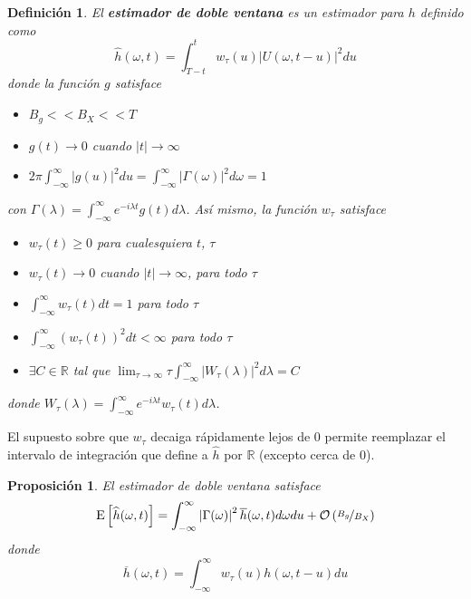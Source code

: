 \documentclass[12pt,letterpaper,draft]{book}
\newtheorem{definicion}{Definición}[chapter]
\newtheorem{proposicion}[teorema]{Proposición}
\newcommand{\R}{\mathbb{R}}
\newcommand{\intR}{\int_{-\infty}^{\infty}}
\newcommand{\E}[1]{\mathrm{E}\left[ #1 \right]}
\newcommand{\abso}[1]{\left| #1 \right|}
\newcommand{\orden}[1]{\mathcal{O}\left( #1 \right)}
\begin{document}
\begin{definicion}
El \textbf{estimador de doble ventana} es un estimador para $h$ definido como
\begin{equation}
\widehat{h}(\omega, t) = \int_{T-t}^{t} w_\tau (u) \abso{U(\omega,t-u)}^{2} du
\end{equation}
donde la función $g$ satisface
\begin{itemize}
\item $B_g << B_X << T$
\item $g(t) \rightarrow 0$ cuando $\abso{t} \rightarrow \infty$
\item $2\pi \intR \abso{g(u)}^{2} du = \intR \abso{\Gamma(\omega)}^{2} d\omega = 1$
\end{itemize}
con $\Gamma(\lambda) = \intR e^{-i \lambda t} g(t) d\lambda$. Así mismo, la función $w_\tau$ satisface
\begin{itemize}
\item $w_\tau(t) \geq 0$ para cualesquiera $t$, $\tau$
\item $w_\tau(t) \rightarrow 0$ cuando $\abso{t} \rightarrow \infty$, para todo $\tau$
\item $\displaystyle \intR w_\tau(t) dt = 1$ para todo $\tau$
\item $\displaystyle \intR \left( w_\tau(t) \right)^{2} dt < \infty$ para todo $\tau$
\item $\exists C \in \R$ tal que  
$\displaystyle \lim_{\tau\rightarrow\infty} \tau \intR \abso{ W_{\tau}(\lambda) }^{2} d\lambda = C$
\end{itemize}
donde $W_\tau(\lambda) = \intR e^{-i \lambda t} w_\tau(t) d\lambda$.
\label{estimador_doble_ventana}
\end{definicion}

El supuesto sobre que $w_\tau$ decaiga rápidamente lejos de 0 permite reemplazar el intervalo de integración que define a $\widehat{h}$ por $\R$ (excepto cerca de 0). 

\begin{proposicion}
El estimador de doble ventana satisface
\begin{equation}
\E{\widehat{h}(\omega, t)} = \intR \abso{\Gamma(\omega)}^{2} \overline{h}(\omega,t) d\omega du +
\orden{\nicefrac{B_g}{B_X}}
\end{equation}
donde
\begin{equation}
\overline{h}(\omega,t) = \intR w_\tau (u) h(\omega, t-u) du
\end{equation}
\end{proposicion}
\end{document}
